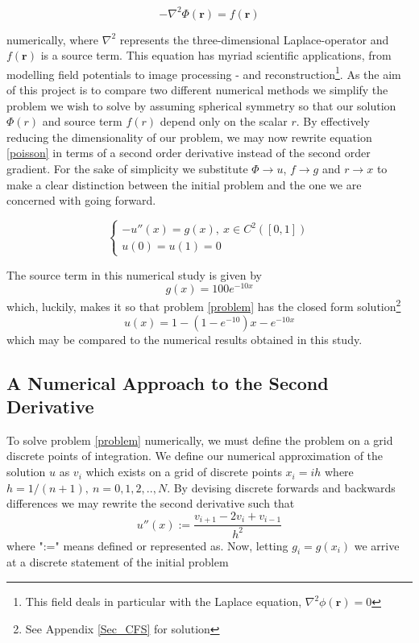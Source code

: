 \documentclass[a4paper, english]{amsart} %
\begin{document}
\begin{equation}
	-\nabla^2\Phi(\mathbf{r}) = f(\mathbf{r})
	\label{poisson}
\end{equation}

numerically, where $\nabla^2$ represents the three-dimensional Laplace-operator and $f(\mathbf{r})$ is a source term. This equation has myriad scientific applications, from modelling field potentials to image processing - and reconstruction\footnote{This field deals in particular with the Laplace equation, $\nabla^2\phi(\mathbf{r}) = 0$}. As the aim of this project is to compare two different numerical methods we simplify the problem we wish to solve by assuming spherical symmetry so that our solution $\Phi(r)$ and source term $f(r)$ depend only on the scalar $r$. By effectively reducing the dimensionality of our problem, we may now rewrite equation \eqref{poisson} in terms of a second order derivative instead of the second order gradient. For the sake of simplicity we substitute $\Phi \rightarrow u$, $f \rightarrow g$ and $r \rightarrow x$ to make a clear distinction between the initial problem and the one we are concerned with going forward. 

\begin{equation}
	\begin{cases}
	-u''(x) = g(x),\ x \in C^2([0,1])\\
	u(0) = u(1) = 0
	\end{cases} 
	\label{problem}
\end{equation}

The source term in this numerical study is given by 
$$
g(x) = 100e^{-10x}
$$
which, luckily, makes it so that problem \eqref{problem} has the closed form solution\footnote{See Appendix \ref{Sec_CFS} for solution}
$$
u(x) = 1-\left(1-e^{-10}\right)x-e^{-10x}
$$
which may be compared to the numerical results obtained in this study.
\newpage
\subsection{A Numerical Approach to the Second Derivative}
To solve problem \eqref{problem} numerically, we must define the problem on a grid discrete points of integration. We define our numerical approximation of the solution $u$ as $v_i$ which exists on a grid of discrete points $x_i = ih$ where $h = 1/(n+1),\ n = 0,1,2,..,N$. By devising discrete forwards and backwards differences we may rewrite the second derivative such that
\begin{equation}
	u''(x) := \frac{v_{i+1}-2v_i +v_{i-1}}{h^2}
\end{equation}
where ":=" means defined or represented as. Now, letting $g_i = g(x_i)$ we arrive at a discrete statement of the initial problem
\end{document}
